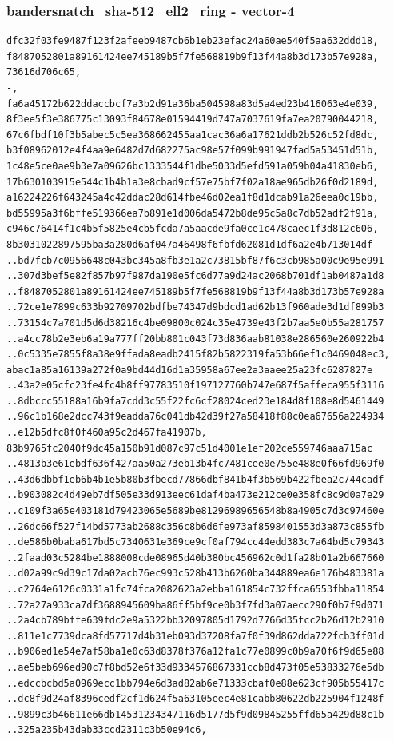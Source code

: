 \documentclass[
]{article}
\begin{document}
\subsubsection{bandersnatch\_sha-512\_ell2\_ring -
vector-4}\label{bandersnatch_sha-512_ell2_ring---vector-4}

\begin{verbatim}
dfc32f03fe9487f123f2afeeb9487cb6b1eb23efac24a60ae540f5aa632ddd18,
f8487052801a89161424ee745189b5f7fe568819b9f13f44a8b3d173b57e928a,
73616d706c65,
-,
fa6a45172b622ddaccbcf7a3b2d91a36ba504598a83d5a4ed23b416063e4e039,
8f3ee5f3e386775c13093f84678e01594419d747a7037619fa7ea20790044218,
67c6fbdf10f3b5abec5c5ea368662455aa1cac36a6a17621ddb2b526c52fd8dc,
b3f08962012e4f4aa9e6482d7d682275ac98e57f099b991947fad5a53451d51b,
1c48e5ce0ae9b3e7a09626bc1333544f1dbe5033d5efd591a059b04a41830eb6,
17b630103915e544c1b4b1a3e8cbad9cf57e75bf7f02a18ae965db26f0d2189d,
a16224226f643245a4c42ddac28d614fbe46d02ea1f8d1dcab91a26eea0c19bb,
bd55995a3f6bffe519366ea7b891e1d006da5472b8de95c5a8c7db52adf2f91a,
c946c76414f1c4b5f5825e4cb5fcda7a5aacde9fa0ce1c478caec1f3d812c606,
8b3031022897595ba3a280d6af047a46498f6fbfd62081d1df6a2e4b713014df
..bd7fcb7c0956648c043bc345a8fb3e1a2c73815bf87f6c3cb985a00c9e95e991
..307d3bef5e82f857b97f987da190e5fc6d77a9d24ac2068b701df1ab0487a1d8
..f8487052801a89161424ee745189b5f7fe568819b9f13f44a8b3d173b57e928a
..72ce1e7899c633b92709702bdfbe74347d9bdcd1ad62b13f960ade3d1df899b3
..73154c7a701d5d6d38216c4be09800c024c35e4739e43f2b7aa5e0b55a281757
..a4cc78b2e3eb6a19a777ff20bb801c043f73d836aab81038e286560e260922b4
..0c5335e7855f8a38e9ffada8eadb2415f82b5822319fa53b66ef1c0469048ec3,
abac1a85a16139a272f0a9bd44d16d1a35958a67ee2a3aaee25a23fc6287827e
..43a2e05cfc23fe4fc4b8ff97783510f197127760b747e687f5affeca955f3116
..8dbccc55188a16b9fa7cdd3c55f22fc6cf28024ced23e184d8f108e8d5461449
..96c1b168e2dcc743f9eadda76c041db42d39f27a58418f88c0ea67656a224934
..e12b5dfc8f0f460a95c2d467fa41907b,
83b9765fc2040f9dc45a150b91d087c97c51d4001e1ef202ce559746aaa715ac
..4813b3e61ebdf636f427aa50a273eb13b4fc7481cee0e755e488e0f66fd969f0
..43d6dbbf1eb6b4b1e5b80b3fbecd77866dbf841b4f3b569b422fbea2c744cadf
..b903082c4d49eb7df505e33d913eec61daf4ba473e212ce0e358fc8c9d0a7e29
..c109f3a65e403181d79423065e5689be81296989656548b8a4905c7d3c97460e
..26dc66f527f14bd5773ab2688c356c8b6d6fe973af8598401553d3a873c855fb
..de586b0baba617bd5c7340631e369ce9cf0af794cc44edd383c7a64bd5c79343
..2faad03c5284be1888008cde08965d40b380bc456962c0d1fa28b01a2b667660
..d02a99c9d39c17da02acb76ec993c528b413b6260ba344889ea6e176b483381a
..c2764e6126c0331a1fc74fca2082623a2ebba161854c732ffca6553fbba11854
..72a27a933ca7df3688945609ba86ff5bf9ce0b3f7fd3a07aecc290f0b7f9d071
..2a4cb789bffe639fdc2e9a5322bb32097805d1792d7766d35fcc2b26d12b2910
..811e1c7739dca8fd57717d4b31eb093d37208fa7f0f39d862dda722fcb3ff01d
..b906ed1e54e7af58ba1e0c63d8378f376a12fa1c77e0899c0b9a70f6f9d65e88
..ae5beb696ed90c7f8bd52e6f33d9334576867331ccb8d473f05e53833276e5db
..edccbcbd5a0969ecc1bb794e6d3ad82ab6e71333cbaf0e88e623cf905b55417c
..dc8f9d24af8396cedf2cf1d624f5a63105eec4e81cabb80622db225904f1248f
..9899c3b46611e66db14531234347116d5177d5f9d09845255ffd65a429d88c1b
..325a235b43dab33ccd2311c3b50e94c6,
\end{verbatim}
\end{document}
